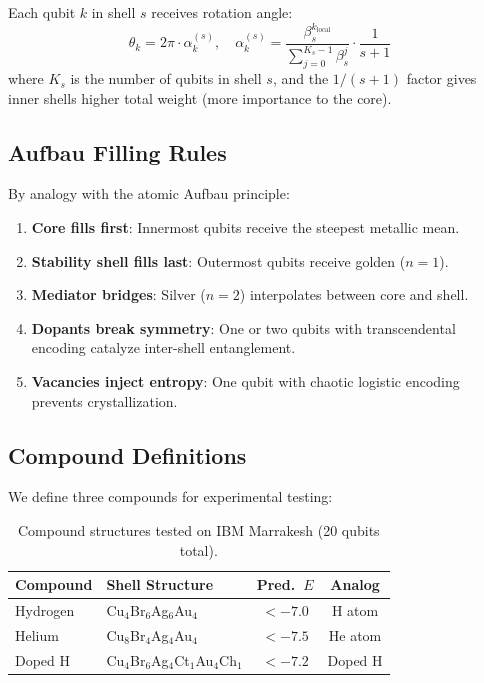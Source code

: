 \documentclass[twocolumn,showpacs,preprintnumbers,amsmath,amssymb,aps,prl]{revtex4-2}
\begin{document}
Each qubit $k$ in shell $s$ receives rotation angle:
\begin{equation}
    \theta_k = 2\pi \cdot \alpha_k^{(s)}, \quad \alpha_k^{(s)} = \frac{\beta_s^{k_{\text{local}}}}{\sum_{j=0}^{K_s - 1} \beta_s^j} \cdot \frac{1}{s + 1}
\end{equation}
where $K_s$ is the number of qubits in shell $s$, and the $1/(s+1)$ factor gives inner shells higher total weight (more importance to the core).

\subsection{Aufbau Filling Rules}

By analogy with the atomic Aufbau principle:
\begin{enumerate}
    \item \textbf{Core fills first}: Innermost qubits receive the steepest metallic mean.
    \item \textbf{Stability shell fills last}: Outermost qubits receive golden ($n\!=\!1$).
    \item \textbf{Mediator bridges}: Silver ($n\!=\!2$) interpolates between core and shell.
    \item \textbf{Dopants break symmetry}: One or two qubits with transcendental encoding catalyze inter-shell entanglement.
    \item \textbf{Vacancies inject entropy}: One qubit with chaotic logistic encoding prevents crystallization.
\end{enumerate}

\subsection{Compound Definitions}

We define three compounds for experimental testing:

\begin{table}[h]
\centering
\caption{Compound structures tested on IBM Marrakesh (20 qubits total).}
\label{tab:compounds}
\begin{tabular}{llcc}
\toprule
\textbf{Compound} & \textbf{Shell Structure} & \textbf{Pred.\ $E$} & \textbf{Analog} \\
\midrule
Hydrogen & Cu$_4$Br$_6$Ag$_6$Au$_4$ & $<-7.0$ & H atom \\
Helium & Cu$_8$Br$_4$Ag$_4$Au$_4$ & $<-7.5$ & He atom \\
Doped H & Cu$_4$Br$_6$Ag$_4$Ct$_1$Au$_4$Ch$_1$ & $<-7.2$ & Doped H \\
\bottomrule
\end{tabular}
\end{table}
\end{document}
